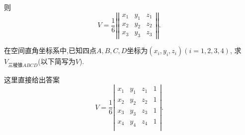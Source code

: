  则
 $$
 V=\frac{1}{6}
 \left|\left|
    \begin{array}{ccc}
      x_1&y_1&z_1\\
      x_2&y_2&z_2\\
      x_3&y_3&z_3
    \end{array}
  \right|\right|.
 $$
 \solend

 \prob 在空间直角坐标系中,已知四点$A,B,C,D
 \textrm{坐标为}(x_i,y_i,z_i)(i=1,2,3,4)$,
 求$V_{\textrm{三棱锥}ABCD}$(以下简写为$V$).

\sol 这里直接给出答案
$$
V=\frac{1}{6}
\left|
    \begin{array}{cccc}
      x_1&y_1&z_1&1\\
      x_2&y_2&z_2&1\\
      x_3&y_3&z_3&1\\
      x_4&y_4&z_4&1\\
    \end{array}
  \right|.
$$
\solend
